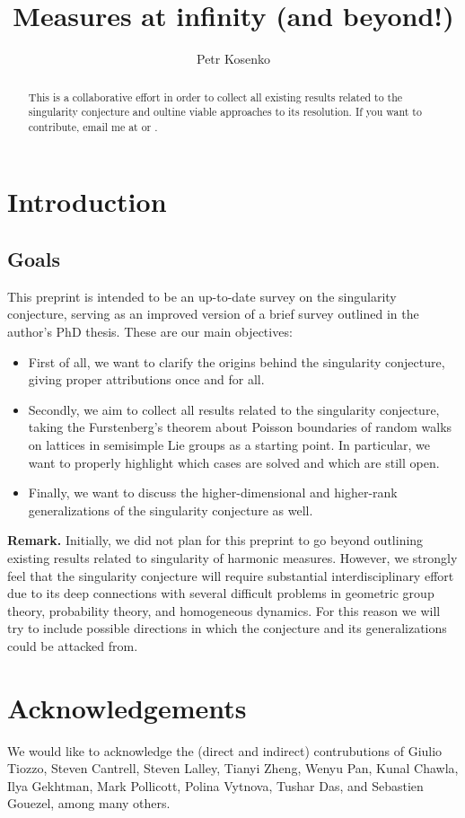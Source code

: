 \documentclass[11pt]{amsart}
\title{Measures at infinity (and beyond!)}
\author{Petr Kosenko}
\theoremstyle{definition}
\begin{document}
	\maketitle
	\begin{abstract}
		This is a collaborative effort in order to collect all existing results related to the singularity conjecture and oultine viable approaches to its resolution. If you want to contribute, email me at  or .
	\end{abstract}
	
	\section{Introduction}
	\subsection{Goals}
	This preprint is intended to be an up-to-date survey on the singularity conjecture, serving as an improved version of a brief survey outlined in the author's PhD thesis. These are our main objectives:
	\begin{itemize}
		\item First of all, we want to clarify the origins behind the singularity conjecture, giving proper attributions once and for all.
		\item Secondly, we aim to collect all results related to the singularity conjecture, taking the Furstenberg's theorem about Poisson boundaries of random walks on lattices in semisimple Lie groups as a starting point. In particular, we want to properly highlight which cases are solved and which are still open.
		\item Finally, we want to discuss the higher-dimensional and higher-rank generalizations of the singularity conjecture as well.
	\end{itemize}
	\textbf{Remark.} Initially, we did not plan for this preprint to go beyond outlining existing results related to singularity of harmonic measures. However, we strongly feel that the singularity conjecture will require substantial interdisciplinary effort due to its deep connections with several difficult problems in geometric group theory, probability theory, and homogeneous dynamics. For this reason we will try to include possible directions in which the conjecture and its generalizations could be attacked from.
	
	\section{Acknowledgements}
	We would like to acknowledge the (direct and indirect) contrubutions of Giulio Tiozzo, Steven Cantrell, Steven Lalley, Tianyi Zheng, Wenyu Pan, Kunal Chawla, Ilya Gekhtman, Mark Pollicott, Polina Vytnova, Tushar Das, and Sebastien Gouezel, among many others.
	
\end{document}
